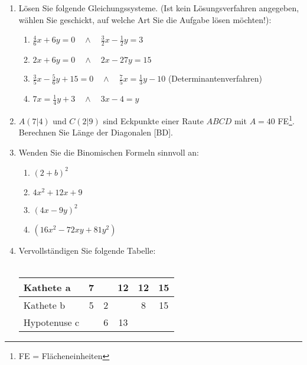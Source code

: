 \documentclass{scrartcl}
\begin{document}
\begin{enumerate}
			
		\item Lösen Sie folgende Gleichungssysteme. (Ist kein Lösungsverfahren angegeben, wählen Sie geschickt, auf welche Art Sie die Aufgabe lösen möchten!):
			\begin{enumerate}
				\item $ \frac{4}{6}x + 6y = 0 \quad \wedge \quad \frac{3}{2}x - \frac{1}{2}y =3$
				\item $ 2x + 6y = 0 \quad \wedge \quad 2x - 27y =15$
				\item $ \frac{3}{5}x - \frac{5}{6} y + 15= 0 \quad \wedge \quad \frac{7}{5}x = \frac{1}{3}y -10$ \quad (Determinantenverfahren)
				\item $7x = \frac{1}{4}y +3 \quad \wedge \quad 3x -4 = y$
				 \\
			\end{enumerate}
		\item $A (7|4)$ und $C(2|9)$ sind Eckpunkte einer Raute $ABCD$ mit $A = 40$ FE\footnote{FE = Flächeneinheiten}. Berechnen Sie Länge der Diagonalen [BD].
		\item Wenden Sie die Binomischen Formeln sinnvoll an:
				\begin{enumerate} 
					\item $(2+b)^2$
					\item $4x^2+12x+9$
					\item $(4x -9y)^2$
					\item $(16x^2 -72xy +81y^2)$
				\end{enumerate}
		\item Vervollständigen Sie folgende Tabelle: \\ \\
				\begin{tabular}[c]{|l|c|c|c|c|c|}
				\hline
				Kathete a    & 7 &   & 12 & 12 & 15 \\ \hline
				Kathete b    & 5 & 2 &    & 8  & 15 \\ \hline
				Hypotenuse c &   & 6 & 13 &    &    \\ \hline
				\end{tabular}
	\end{enumerate} 
	
	
\end{document}
